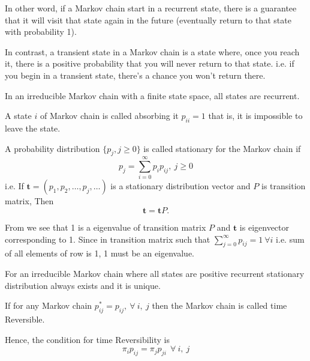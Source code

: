 In other word, if a Markov chain start in a recurrent state, there is a guarantee that it will visit that state again in the future
(eventually return to that state with probability 1).

In contrast, a transient state in a Markov chain is a state where, once you reach it, 
there is a positive probability that you will never return to that state.
i.e. if you begin in a transient state, there's a chance you won't return there.
\begin{proposition}
     In an irreducible Markov chain with a finite state space, all states are recurrent.
\end{proposition}
\begin{definition}
    A state $ i $ of Markov chain is called absorbing it  $ p_{ii} = 1 $ that is, it is impossible to leave 
    the state. 
\end{definition}

\begin{definition}
    \label{Stationary distribution}
    A probability distribution $ \{p_{j},j\ge 0\} $ is called stationary for the Markov chain if 
    \begin{equation}
        \label{1st stationary distribution}
        p_{j} = \sum_{i=0}^{\infty} p_{i}p_{ij},\ j \ge 0
    \end{equation}
    i.e. If $ \mathbf{t}=(p_{1},p_{2},\ldots,p_{j},\ldots) $ is a stationary distribution vector and $ P $ is transition matrix, Then
    \begin{equation}
        \label{stationary distribution matrix}
         \mathbf{t}=\mathbf{t}P.
    \end{equation}
\end{definition}
From  we see that 1 is a eigenvalue of transition matrix $ P $ and  $ \mathbf{t} $ is eigenvector corresponding
to 1. Since in transition matrix  such that  $ \sum_{j=0}^{\infty} p_{ij} = 1\ \forall i$ i.e. sum of all elements of row is 1,
1 must be an eigenvalue.

For an irreducible Markov chain where all states are positive recurrent stationary distribution always exists and it is unique.

\begin{definition}
    If for any Markov chain $ p^{*}_{ij}=p_{ij} ,\ \forall\ i,\ j$ then  the Markov chain is called time Reversible.
\end{definition}
Hence, the condition for time Reversibility is 
\[
    \pi_{i}p_{ij} =\pi_{j}p_{ji} \ \ \forall\ i, \ j
\]

